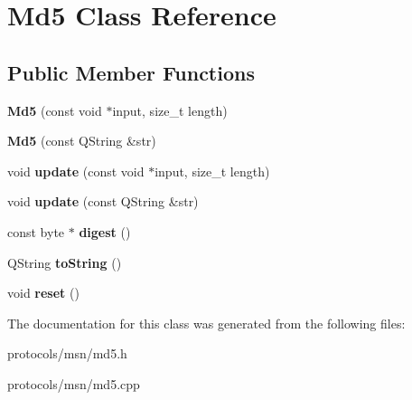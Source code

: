 \hypertarget{classMd5}{
\section{Md5 Class Reference}
\label{classMd5}
}
\subsection*{Public Member Functions}
\begin{DoxyCompactItemize}
\item 
\hypertarget{classMd5_a87807ca33ebc9628f15f08cc369942f9}{
{\bfseries Md5} (const void $\ast$input, size\_\-t length)}
\label{classMd5_a87807ca33ebc9628f15f08cc369942f9}

\item 
\hypertarget{classMd5_a29a265f69e72089efb653bd0fa3cfaeb}{
{\bfseries Md5} (const QString \&str)}
\label{classMd5_a29a265f69e72089efb653bd0fa3cfaeb}

\item 
\hypertarget{classMd5_a75fc5c169c898f350bca068bf97e55da}{
void {\bfseries update} (const void $\ast$input, size\_\-t length)}
\label{classMd5_a75fc5c169c898f350bca068bf97e55da}

\item 
\hypertarget{classMd5_af73c5a64419f39914bbb747e92da415a}{
void {\bfseries update} (const QString \&str)}
\label{classMd5_af73c5a64419f39914bbb747e92da415a}

\item 
\hypertarget{classMd5_a40a6af361fdaa7231c75fc0bcc925b41}{
const byte $\ast$ {\bfseries digest} ()}
\label{classMd5_a40a6af361fdaa7231c75fc0bcc925b41}

\item 
\hypertarget{classMd5_ac8a4810328de2b25561d4d3fa7b35018}{
QString {\bfseries toString} ()}
\label{classMd5_ac8a4810328de2b25561d4d3fa7b35018}

\item 
\hypertarget{classMd5_ab5a5e4ddd985062cdae05540ef0b5152}{
void {\bfseries reset} ()}
\label{classMd5_ab5a5e4ddd985062cdae05540ef0b5152}

\end{DoxyCompactItemize}


The documentation for this class was generated from the following files:\begin{DoxyCompactItemize}
\item 
protocols/msn/md5.h\item 
protocols/msn/md5.cpp\end{DoxyCompactItemize}
